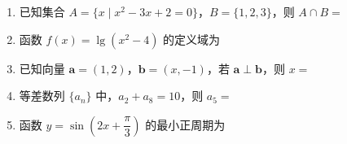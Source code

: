 \documentclass[zihao=-4,a4paper]{ctexart}
\begin{document}
\begin{enumerate}[label=\textbf{\arabic*.}, itemsep=6pt]
  \item 已知集合 $A = \{x \mid x^2 - 3x + 2 = 0\}$，$B = \{1, 2, 3\}$，则 $A \cap B =$

  \item 函数 $f(x) = \lg\left(x^2 - 4\right)$ 的定义域为

  \item 已知向量 $\boldsymbol{a} = (1, 2)$，$\boldsymbol{b} = (x, -1)$，若 $\boldsymbol{a} \perp \boldsymbol{b}$，则 $x =$

  \item 等差数列 $\{a_n\}$ 中，$a_2 + a_8 = 10$，则 $a_5 =$

  \item 函数 $y = \sin\left(2x + \dfrac{\pi}{3}\right)$ 的最小正周期为


\end{enumerate}
\end{document}
